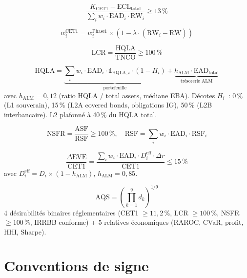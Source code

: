 \documentclass[10pt, a4paper, oneside]{report}
\theoremstyle{definition}
\begin{document}
\begin{equation}
\frac{K_{\text{CET1}} - \text{ECL}_{\text{total}}}{\sum_i w_i \cdot \text{EAD}_i \cdot \text{RW}_i} \geq 13\,\%
\label{eq:cet1-constraint}
\end{equation}

\begin{equation}
w_i^{\text{CET1}} = w_i^{\text{Phase1}} \times \left(1 - \lambda \cdot (\text{RW}_i - \overline{\text{RW}})\right)
\label{eq:cet1-gradient}
\end{equation}

\begin{equation}
\text{LCR} = \frac{\text{HQLA}}{\text{TNCO}} \geq 100\,\%
\label{eq:lcr}
\end{equation}

\begin{equation}
\text{HQLA} = \underbrace{\sum_i w_i \cdot \text{EAD}_i \cdot \mathbb{1}_{\text{HQLA},i} \cdot (1 - H_i)}_{\text{portefeuille}} + \underbrace{h_{\text{ALM}} \cdot \text{EAD}_{\text{total}}}_{\text{trésorerie ALM}}
\label{eq:hqla}
\end{equation}
avec $h_{\text{ALM}} = 0{,}12$ (ratio HQLA / total assets, médiane EBA). Décotes $H_i$~: 0\,\% (L1 souverain), 15\,\% (L2A covered bonds, obligations IG), 50\,\% (L2B interbancaire). L2 plafonné à 40\,\% du HQLA total.

\begin{equation}
\text{NSFR} = \frac{\text{ASF}}{\text{RSF}} \geq 100\,\%, \quad \text{RSF} = \sum_i w_i \cdot \text{EAD}_i \cdot \text{RSF}_i
\label{eq:nsfr}
\end{equation}

\begin{equation}
\frac{\Delta \text{EVE}}{\text{CET1}} = \frac{\sum_i w_i \cdot \text{EAD}_i \cdot D_i^{\text{eff}} \cdot \Delta r}{\text{CET1}} \leq 15\,\%
\label{eq:irrbb}
\end{equation}
avec $D_i^{\text{eff}} = D_i \times (1 - h_{\text{ALM}})$, $h_{\text{ALM}} = 0{,}85$.

\begin{equation}
\text{AQS} = \left(\prod_{k=1}^{9} d_k\right)^{1/9}
\label{eq:aqs}
\end{equation}
4 désirabilités binaires réglementaires (CET1 $\geq 11{,}2\,\%$, LCR $\geq 100\,\%$, NSFR $\geq 100\,\%$, IRRBB conforme) + 5 relatives économiques (RAROC, CVaR, profit, HHI, Sharpe).


\section{Conventions de signe}
\label{sec:annexe:conventions}
\end{document}
